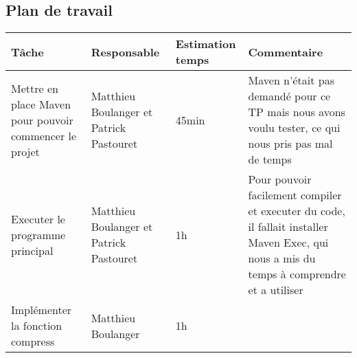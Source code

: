 \documentclass[a4paper,11pt]{article}
\begin{document}
\subsection{Plan de travail}
\begin{center}
    \begin{tabular}{p{.3\linewidth}p{.3\linewidth}p{.3\linewidth}p{.3\linewidth}}
      \toprule
	Tâche & Responsable & Estimation temps & Commentaire \\
      \midrule
      Mettre en place Maven pour pouvoir commencer le projet & 
      Matthieu Boulanger et Patrick Pastouret & 
      45min & 
      Maven n'était pas demandé pour ce TP mais nous avons voulu tester, ce qui nous pris pas mal de temps \\
      Executer le programme principal &
      Matthieu Boulanger et Patrick Pastouret &
      1h &
      Pour pouvoir facilement compiler et executer du code, il fallait installer Maven Exec, qui nous a mis du temps à comprendre et a utiliser\\
      Implémenter la fonction compress &
      Matthieu Boulanger &
      1h &
      \\
      \bottomrule
   \end{tabular}
\end{center}
\end{document}
